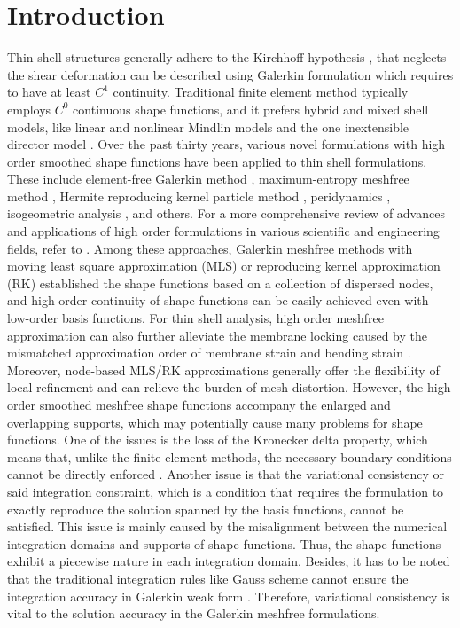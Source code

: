 \section{Introduction}\label{introduction}
Thin shell structures generally adhere to the Kirchhoff hypothesis \cite{donnell1976}, that neglects the shear deformation can be described using Galerkin formulation which requires to have at least $C^1$ continuity. 
Traditional finite element method typically employs $C^0$ continuous shape functions, and it prefers hybrid and mixed shell models, like linear and nonlinear Mindlin models \cite{ahmad1970, hughes2000} and the one inextensible director model \cite{simo1989b}. 
Over the past thirty years, various novel formulations with high order smoothed shape functions have been applied to thin shell formulations. These include element-free Galerkin method \cite{krysl1996}, maximum-entropy meshfree method \cite{millan2011}, Hermite reproducing kernel particle method \cite{wang2015a}, peridynamics \cite{behzadinasab2022}, isogeometric analysis \cite{kiendl2009}, and others.
For a more comprehensive review of advances and applications of high order formulations in various scientific and engineering fields, refer to \cite{liu2009,chen2017,zhang2017a,suchde2022,wang2023b,deng2023a,wang2024,wang2024a}.
Among these approaches, Galerkin meshfree methods with moving least square approximation (MLS) \cite{belytschko1994} or reproducing kernel approximation (RK) \cite{liu1995} established the shape functions based on a collection of dispersed nodes, and high order continuity of shape functions can be easily achieved even with low-order basis functions. For thin shell analysis, high order meshfree approximation can also further alleviate the membrane locking caused by the mismatched approximation order of membrane strain and bending strain \cite{krysl1996}. 
Moreover, node-based MLS/RK approximations generally offer the flexibility of local refinement and can relieve the burden of mesh distortion. 
However, the high order smoothed meshfree shape functions accompany the enlarged and overlapping supports, which may potentially cause many problems for shape functions. One of the issues is the loss of the Kronecker delta property, which means that, unlike the finite element methods, the necessary boundary conditions cannot be directly enforced  \cite{fernandez-mendez2004}. Another issue is that the variational consistency or said integration constraint, which is a condition that requires the formulation to exactly reproduce the solution spanned by the basis functions, cannot be satisfied. This issue is mainly caused by the misalignment between the numerical integration domains and supports of shape functions. Thus, the shape functions exhibit a piecewise nature in each integration domain. Besides, it has to be noted that the traditional integration rules like Gauss scheme cannot ensure the integration accuracy in Galerkin weak form \cite{li2016, wu2021}. Therefore, variational consistency is vital to the solution accuracy in the Galerkin meshfree formulations.

